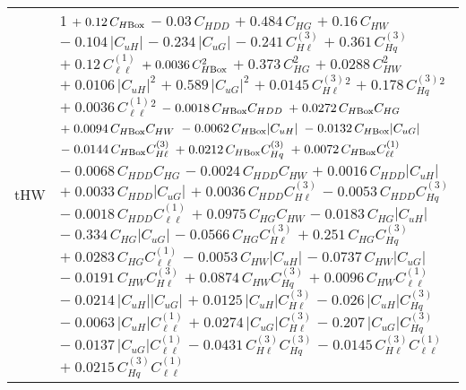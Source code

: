 \begin{tabular}{l|p{}}
    \hline
    tHW & 1 $+\;0.12\,C_{H\rm{Box}}$ $-\;0.03\,C_{HDD}$ $+\;0.484\,C_{HG}$ $+\;0.16\,C_{HW}$ $-\;0.104\,|C_{uH}|$ $-\;0.234\,|C_{uG}|$ $-\;0.241\,C^{(3)}_{H\ell}$ $+\;0.361\,C^{(3)}_{Hq}$ $+\;0.12\,C^{(1)}_{\ell\ell}$ $+\;0.0036\,C_{H\rm{Box}}^{2}$ $+\;0.373\,C_{HG}^{2}$ $+\;0.0288\,C_{HW}^{2}$ $+\;0.0106\,|C_{uH}|^{2}$ $+\;0.589\,|C_{uG}|^{2}$ $+\;0.0145\,C^{(3)}_{H\ell}^{2}$ $+\;0.178\,C^{(3)}_{Hq}^{2}$ $+\;0.0036\,C^{(1)}_{\ell\ell}^{2}$ $-\;0.0018\,C_{H\rm{Box}}C_{HDD}$ $+\;0.0272\,C_{H\rm{Box}}C_{HG}$ $+\;0.0094\,C_{H\rm{Box}}C_{HW}$ $-\;0.0062\,C_{H\rm{Box}}|C_{uH}|$ $-\;0.0132\,C_{H\rm{Box}}|C_{uG}|$ $-\;0.0144\,C_{H\rm{Box}}C^{(3)}_{H\ell}$ $+\;0.0212\,C_{H\rm{Box}}C^{(3)}_{Hq}$ $+\;0.0072\,C_{H\rm{Box}}C^{(1)}_{\ell\ell}$ $-\;0.0068\,C_{HDD}C_{HG}$ $-\;0.0024\,C_{HDD}C_{HW}$ $+\;0.0016\,C_{HDD}|C_{uH}|$ $+\;0.0033\,C_{HDD}|C_{uG}|$ $+\;0.0036\,C_{HDD}C^{(3)}_{H\ell}$ $-\;0.0053\,C_{HDD}C^{(3)}_{Hq}$ $-\;0.0018\,C_{HDD}C^{(1)}_{\ell\ell}$ $+\;0.0975\,C_{HG}C_{HW}$ $-\;0.0183\,C_{HG}|C_{uH}|$ $-\;0.334\,C_{HG}|C_{uG}|$ $-\;0.0566\,C_{HG}C^{(3)}_{H\ell}$ $+\;0.251\,C_{HG}C^{(3)}_{Hq}$ $+\;0.0283\,C_{HG}C^{(1)}_{\ell\ell}$ $-\;0.0053\,C_{HW}|C_{uH}|$ $-\;0.0737\,C_{HW}|C_{uG}|$ $-\;0.0191\,C_{HW}C^{(3)}_{H\ell}$ $+\;0.0874\,C_{HW}C^{(3)}_{Hq}$ $+\;0.0096\,C_{HW}C^{(1)}_{\ell\ell}$ $-\;0.0214\,|C_{uH}||C_{uG}|$ $+\;0.0125\,|C_{uH}|C^{(3)}_{H\ell}$ $-\;0.026\,|C_{uH}|C^{(3)}_{Hq}$ $-\;0.0063\,|C_{uH}|C^{(1)}_{\ell\ell}$ $+\;0.0274\,|C_{uG}|C^{(3)}_{H\ell}$ $-\;0.207\,|C_{uG}|C^{(3)}_{Hq}$ $-\;0.0137\,|C_{uG}|C^{(1)}_{\ell\ell}$ $-\;0.0431\,C^{(3)}_{H\ell}C^{(3)}_{Hq}$ $-\;0.0145\,C^{(3)}_{H\ell}C^{(1)}_{\ell\ell}$ $+\;0.0215\,C^{(3)}_{Hq}C^{(1)}_{\ell\ell}$ \\
\end{tabular}